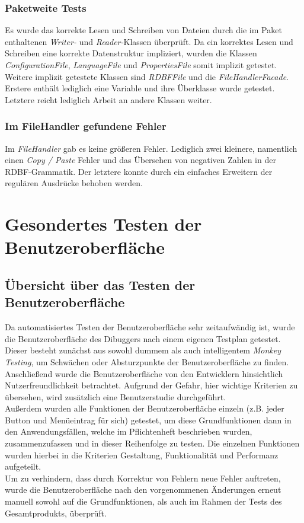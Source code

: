 \documentclass[parskip=full]{scrartcl}
\begin{document}
\subsubsection{Paketweite Tests}
Es wurde das korrekte Lesen und Schreiben von Dateien durch die im Paket enthaltenen \textit{Writer-} und \textit{Reader-}Klassen überprüft.
Da ein korrektes Lesen und Schreiben eine korrekte Datenstruktur impliziert, wurden die Klassen \textit{ConfigurationFile}, \textit{LanguageFile} und \textit{PropertiesFile} somit implizit getestet. Weitere implizit getestete Klassen sind \textit{RDBFFile} und die \textit{FileHandlerFacade}. Erstere enthält lediglich eine Variable und ihre Überklasse wurde getestet. Letztere reicht lediglich Arbeit an andere Klassen weiter.

\subsubsection{Im FileHandler gefundene Fehler}
Im \textit{FileHandler} gab es keine größeren Fehler. Lediglich zwei kleinere, namentlich einen \textit{Copy / Paste} Fehler und das Übersehen von negativen Zahlen in der RDBF-Grammatik. Der letztere konnte durch ein einfaches Erweitern der regulären Ausdrücke behoben werden.

\newpage
\section{Gesondertes Testen der Benutzeroberfläche}\label{gui}

\subsection{Übersicht über das Testen der Benutzeroberfläche}
Da automatisiertes Testen der Benutzeroberfläche sehr zeitaufwändig ist, wurde die Benutzeroberfläche des Dibuggers nach einem eigenen Testplan getestet. Dieser besteht zunächst aus sowohl dummem als auch intelligentem \textit{Monkey Testing}, um Schwächen oder Absturzpunkte der Benutzeroberfläche zu finden. \\
Anschließend wurde die Benutzeroberfläche von den Entwicklern hinsichtlich Nutzerfreundlichkeit betrachtet. Aufgrund der Gefahr, hier wichtige Kriterien zu übersehen, wird zusätzlich eine Benutzerstudie durchgeführt. \\
Außerdem wurden alle Funktionen der Benutzeroberfläche einzeln (z.B. jeder Button und Menüeintrag für sich) getestet, um diese Grundfunktionen dann in den Anwendungsfällen, welche im Pflichtenheft beschrieben wurden, zusammenzufassen und in dieser Reihenfolge zu testen. Die einzelnen Funktionen wurden hierbei in die Kriterien Gestaltung, Funktionalität und Performanz aufgeteilt. \\
Um zu verhindern, dass durch Korrektur von Fehlern neue Fehler auftreten, wurde die Benutzeroberfläche nach den vorgenommenen Änderungen erneut manuell sowohl auf die Grundfunktionen, als auch im Rahmen der Tests des Gesamtprodukts, überprüft.
\end{document}
